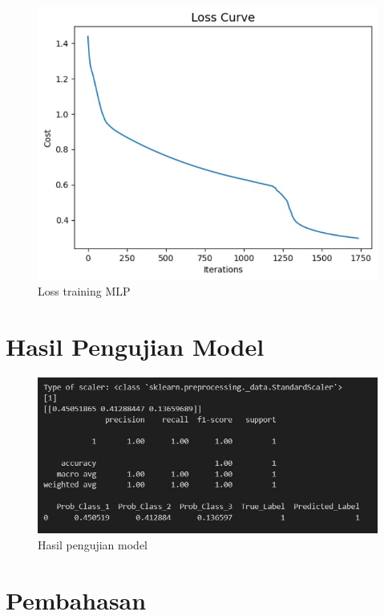 \begin{figure} [H] \centering
  \includegraphics[scale=0.5]{gambar/lossmlp.jpg}
  \caption{Loss training MLP}
  \label{fig:lossmlp}
\end{figure}

\section{Hasil Pengujian Model}
\label{sec:skenariopengujian}
\begin{figure} [H] \centering
  \includegraphics[scale=0.75]{gambar/predik.jpg}
  \caption{Hasil pengujian model}
  \label{fig:predikmodel}
\end{figure}


\section{Pembahasan}
\label{sec:skenariopengujian}





